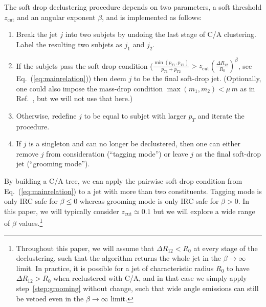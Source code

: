 \documentclass[letterpaper,11pt]{article}
\newcommand{\zcut}{z_\text{cut}}
\DeclareRobustCommand{\Eq}[1]{Eq.~(\ref{#1})}
\DeclareRobustCommand{\Ref}[1]{Ref.~\cite{#1}}
\begin{document}
The soft drop declustering procedure depends on two parameters, a soft threshold $\zcut$ and an angular exponent $\beta$, and is implemented as follows:
\begin{enumerate} 
\item Break the jet $j$ into two subjets by undoing the last stage of C/A clustering.  Label the resulting two subjets as $j_1$ and $j_2$.
\item \label{step:grooming} If the subjets pass the soft drop
  condition \Big($\frac{\min(p_{T1},p_{T2})}{p_{T1}+p_{T2}}>\zcut
  \left(\frac{\Delta R_{12}}{R_0} \right)^\beta$, see
  \Eq{eq:mainrelation}\Big) then deem $j$ to be the final soft-drop
  jet.  (Optionally, one could also impose the mass-drop condition $\max(m_1,m_2)<\mu \,m$ as in \Ref{BDRS}, but we will not use that here.)
\item Otherwise, redefine $j$ to be equal to subjet with larger $p_T$ and iterate the procedure.
\item If $j$ is a singleton and can no longer be declustered, then one can either remove $j$ from consideration (``tagging mode'') or leave $j$ as the final soft-drop jet (``grooming mode'').
\end{enumerate}
By building a C/A tree, we can apply the pairwise soft drop condition from \Eq{eq:mainrelation} to a jet with more than two constituents.  Tagging mode is only IRC safe for $\beta \le 0$ whereas grooming mode is only IRC safe for $\beta > 0$.  In this paper, we will typically consider $\zcut \simeq 0.1$ but we will explore a wide range of $\beta$ values.\footnote{Throughout this paper, we will assume that $\Delta R_{12}<{R_0}$ at every stage of the declustering, such that the algorithm returns the whole jet in the $\beta \to \infty$ limit.  In practice, it is possible for a jet of characteristic radius $R_0$ to have $\Delta R_{12}> {R_0}$ when reclustered with C/A, and in that case we simply apply step~\ref{step:grooming} without change, such that wide angle emissions can still be vetoed even in the $\beta \to \infty$ limit.}
\end{document}
